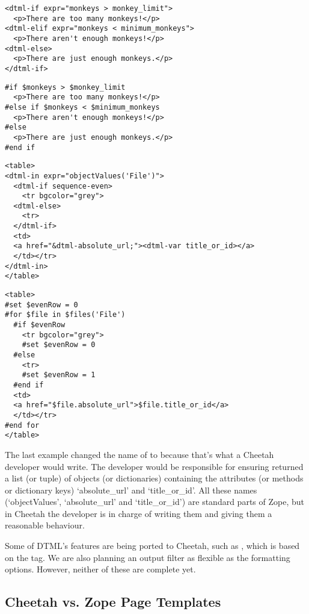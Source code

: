 \begin{verbatim}
<dtml-if expr="monkeys > monkey_limit">
  <p>There are too many monkeys!</p>
<dtml-elif expr="monkeys < minimum_monkeys">
  <p>There aren't enough monkeys!</p>
<dtml-else>
  <p>There are just enough monkeys.</p>
</dtml-if>
\end{verbatim}

\begin{verbatim}
#if $monkeys > $monkey_limit
  <p>There are too many monkeys!</p>
#else if $monkeys < $minimum_monkeys
  <p>There aren't enough monkeys!</p>
#else
  <p>There are just enough monkeys.</p>
#end if
\end{verbatim}

\begin{verbatim}
<table>
<dtml-in expr="objectValues('File')">
  <dtml-if sequence-even>
    <tr bgcolor="grey">
  <dtml-else>
    <tr>
  </dtml-if>    
  <td>
  <a href="&dtml-absolute_url;"><dtml-var title_or_id></a>
  </td></tr>
</dtml-in>
</table>
\end{verbatim}

\begin{verbatim}
<table>
#set $evenRow = 0
#for $file in $files('File')
  #if $evenRow
    <tr bgcolor="grey">
    #set $evenRow = 0
  #else
    <tr>
    #set $evenRow = 1
  #end if
  <td>
  <a href="$file.absolute_url">$file.title_or_id</a>
  </td></tr>
#end for
</table>
\end{verbatim}

The last example changed the name of  to 
 because that's what a Cheetah developer would write.
The developer would be responsible for ensuring  returned a 
list (or tuple) of objects (or dictionaries) containing the attributes (or
methods or dictionary keys) `absolute\_url' and `title\_or\_id'.  All these
names (`objectValues', `absolute\_url' and `title\_or\_id') are standard parts
of Zope, but in Cheetah the developer is in charge of writing them and giving
them a reasonable behaviour.

Some of DTML's features are being ported to Cheetah, such as
, which is based on the
 tag.  We are also planning an output filter as flexible as
the  formatting options.  However, neither of these are
complete yet.

\subsection{Cheetah vs. Zope Page Templates}
\label{comparisons.zpt}

